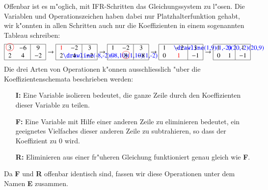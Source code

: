 Offenbar ist es m"oglich, mit IFR-Schritten das Gleichungssystem zu l"osen.
Die Variablen und Operationszeichen haben dabei nur Platzhalterfunktion
gehabt, wir k"onnten in allen Schritten auch nur die Koeffizienten
in einem sogenannten Tableau schreiben:
\begin{gather*}
\begin{tabular}{|>{$}c<{$}>{$}c<{$}|>{$}c<{$}|}
\hline
\begin{picture}(0,0)
{\color{red}\put(2.5,4){\circle{12}}}
\end{picture}
3&-6&9\\
2&4&-2\\
\hline
\end{tabular}
\rightarrow
\begin{tabular}{|>{$}c<{$}>{$}c<{$}|>{$}c<{$}|}
\hline
{\color{red}1}&-2&3\\
2%
\begin{picture}(0,0)
\color{blue}\drawline(-8,-2)(-8,10)(1,10)(1,-2)
\end{picture}%
&4&-2\\
\hline
\end{tabular}
\rightarrow
\begin{tabular}{|>{$}c<{$}>{$}c<{$}|>{$}c<{$}|}
\hline
1&-2&3\\
{\color{blue}0}&\begin{picture}(0,0)
\color{red}\put(2.8,4){\circle{12}}
\end{picture}
8&-8\\
\hline
\end{tabular}
\rightarrow
\begin{tabular}{|>{$}c<{$}>{$}c<{$}|>{$}c<{$}|}
\hline
1&
\begin{picture}(0,0)
\color{blue}\drawline(1,9)(1,-2)(20,-2)(20,9)
\end{picture}%
-2&3\\
0&{\color{red}1}&-1\\
\hline
\end{tabular}
\rightarrow
\begin{tabular}{|>{$}c<{$}>{$}c<{$}|>{$}c<{$}|}
\hline
1&{\color{blue}0}&1\\
0&1&-1\\
\hline
\end{tabular}
\end{gather*}
Die drei Arten von Operationen k"onnen ausschliesslich "uber die
Koeffizientenschemata beschrieben werden:
\begin{itemize}
\item[\bf I:] Eine Variable isolieren bedeutet, die ganze
Zeile durch den Koeffizienten dieser Variable zu teilen.
\item[\bf F:] Eine Variable mit Hilfe einer anderen Zeile zu eliminieren
bedeutet, ein geeignetes Vielfaches dieser anderen Zeile zu subtrahieren,
so dass der Koeffizient zu $0$ wird.
\item[\bf R:] Eliminieren aus einer fr"uheren Gleichung funktioniert
genau gleich wie {\bf F}.
\end{itemize}
Da {\bf F} und {\bf R} offenbar identisch sind, fassen wir diese
Operationen unter dem Namen {\bf E} zusammen.


